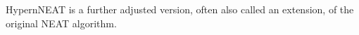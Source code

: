 HypernNEAT is a further adjusted version, often also called an extension, of the original NEAT algorithm.\cite{http://web.mit.edu/jessiehl/Public/aaai11/fullpaper.pdf}


